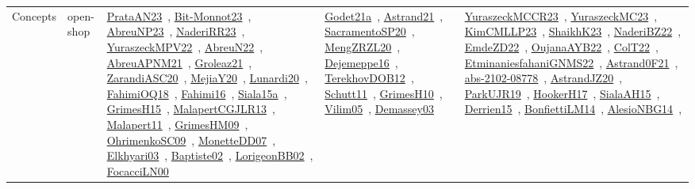 {\begin{longtable}{lp{3cm}>{\raggedright\arraybackslash}p{6cm}>{\raggedright\arraybackslash}p{6cm}>{\raggedright\arraybackslash}p{8cm}}
Concepts & open-shop & \href{works/PrataAN23.pdf}{PrataAN23}~\cite{PrataAN23}, \href{works/Bit-Monnot23.pdf}{Bit-Monnot23}~\cite{Bit-Monnot23}, \href{works/AbreuNP23.pdf}{AbreuNP23}~\cite{AbreuNP23}, \href{works/NaderiRR23.pdf}{NaderiRR23}~\cite{NaderiRR23}, \href{works/YuraszeckMPV22.pdf}{YuraszeckMPV22}~\cite{YuraszeckMPV22}, \href{works/AbreuN22.pdf}{AbreuN22}~\cite{AbreuN22}, \href{works/AbreuAPNM21.pdf}{AbreuAPNM21}~\cite{AbreuAPNM21}, \href{works/Groleaz21.pdf}{Groleaz21}~\cite{Groleaz21}, \href{works/ZarandiASC20.pdf}{ZarandiASC20}~\cite{ZarandiASC20}, \href{works/MejiaY20.pdf}{MejiaY20}~\cite{MejiaY20}, \href{works/Lunardi20.pdf}{Lunardi20}~\cite{Lunardi20}, \href{works/FahimiOQ18.pdf}{FahimiOQ18}~\cite{FahimiOQ18}, \href{works/Fahimi16.pdf}{Fahimi16}~\cite{Fahimi16}, \href{works/Siala15a.pdf}{Siala15a}~\cite{Siala15a}, \href{works/GrimesH15.pdf}{GrimesH15}~\cite{GrimesH15}, \href{works/MalapertCGJLR13.pdf}{MalapertCGJLR13}~\cite{MalapertCGJLR13}, \href{works/Malapert11.pdf}{Malapert11}~\cite{Malapert11}, \href{works/GrimesHM09.pdf}{GrimesHM09}~\cite{GrimesHM09}, \href{works/OhrimenkoSC09.pdf}{OhrimenkoSC09}~\cite{OhrimenkoSC09}, \href{works/MonetteDD07.pdf}{MonetteDD07}~\cite{MonetteDD07}, \href{works/Elkhyari03.pdf}{Elkhyari03}~\cite{Elkhyari03}, \href{works/Baptiste02.pdf}{Baptiste02}~\cite{Baptiste02}, \href{works/LorigeonBB02.pdf}{LorigeonBB02}~\cite{LorigeonBB02}, \href{works/FocacciLN00.pdf}{FocacciLN00}~\cite{FocacciLN00} & \href{works/Godet21a.pdf}{Godet21a}~\cite{Godet21a}, \href{works/Astrand21.pdf}{Astrand21}~\cite{Astrand21}, \href{works/SacramentoSP20.pdf}{SacramentoSP20}~\cite{SacramentoSP20}, \href{works/MengZRZL20.pdf}{MengZRZL20}~\cite{MengZRZL20}, \href{works/Dejemeppe16.pdf}{Dejemeppe16}~\cite{Dejemeppe16}, \href{works/TerekhovDOB12.pdf}{TerekhovDOB12}~\cite{TerekhovDOB12}, \href{works/Schutt11.pdf}{Schutt11}~\cite{Schutt11}, \href{works/GrimesH10.pdf}{GrimesH10}~\cite{GrimesH10}, \href{works/Vilim05.pdf}{Vilim05}~\cite{Vilim05}, \href{works/Demassey03.pdf}{Demassey03}~\cite{Demassey03} & \href{works/YuraszeckMCCR23.pdf}{YuraszeckMCCR23}~\cite{YuraszeckMCCR23}, \href{works/YuraszeckMC23.pdf}{YuraszeckMC23}~\cite{YuraszeckMC23}, \href{works/KimCMLLP23.pdf}{KimCMLLP23}~\cite{KimCMLLP23}, \href{works/ShaikhK23.pdf}{ShaikhK23}~\cite{ShaikhK23}, \href{works/NaderiBZ22.pdf}{NaderiBZ22}~\cite{NaderiBZ22}, \href{works/EmdeZD22.pdf}{EmdeZD22}~\cite{EmdeZD22}, \href{works/OujanaAYB22.pdf}{OujanaAYB22}~\cite{OujanaAYB22}, \href{works/ColT22.pdf}{ColT22}~\cite{ColT22}, \href{works/EtminaniesfahaniGNMS22.pdf}{EtminaniesfahaniGNMS22}~\cite{EtminaniesfahaniGNMS22}, \href{works/Astrand0F21.pdf}{Astrand0F21}~\cite{Astrand0F21}, \href{works/abs-2102-08778.pdf}{abs-2102-08778}~\cite{abs-2102-08778}, \href{works/AstrandJZ20.pdf}{AstrandJZ20}~\cite{AstrandJZ20}, \href{works/ParkUJR19.pdf}{ParkUJR19}~\cite{ParkUJR19}, \href{works/HookerH17.pdf}{HookerH17}~\cite{HookerH17}, \href{works/SialaAH15.pdf}{SialaAH15}~\cite{SialaAH15}, \href{works/Derrien15.pdf}{Derrien15}~\cite{Derrien15}, \href{works/BonfiettiLM14.pdf}{BonfiettiLM14}~\cite{BonfiettiLM14}, \href{works/AlesioNBG14.pdf}{AlesioNBG14}~\cite{AlesioNBG14}, 
\end{longtable}}
